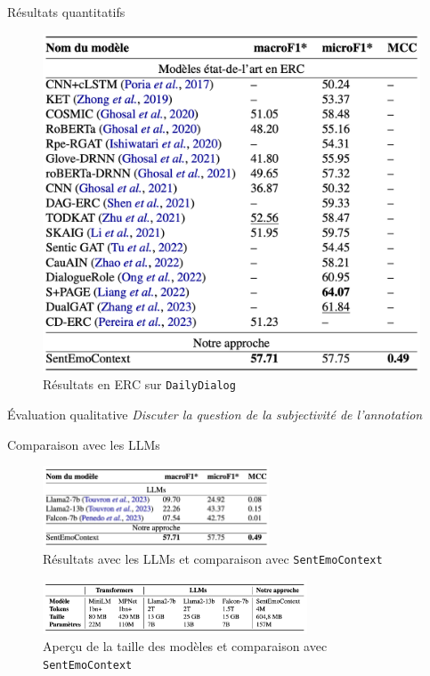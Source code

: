 \documentclass[11pt,aspectratio=169]{beamer}
\begin{document}
\begin{frame}{Résultats quantitatifs}
    \begin{figure}
        \centering
        \includegraphics[scale=0.23]{resultats_sans_llms.png}
        \caption{\centering Résultats en ERC sur \texttt{DailyDialog}}
    \end{figure}
\end{frame}

\begin{frame}{Évaluation qualitative}
    \emph{Discuter la question de la subjectivité de l'annotation}
\end{frame}

\begin{frame}{Comparaison avec les LLMs}
    \begin{figure}
        \centering
        \includegraphics[width=0.6\textwidth]{resultats_llms.png}
        \caption{\centering Résultats avec les LLMs et comparaison avec \texttt{SentEmoContext}}
    \end{figure}
    \begin{figure}
        \centering
        \includegraphics[width=0.7\textwidth]{taille_llms.png}
        \caption{\centering Aperçu de la taille des modèles et comparaison avec \texttt{SentEmoContext}}
    \end{figure}
\end{frame}
\end{document}
